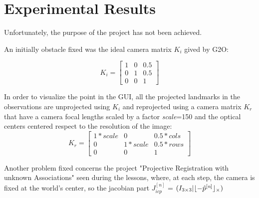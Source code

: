 \documentclass[10pt]{article}
\DeclarePairedDelimiter\floor{\lfloor}{\rfloor}
\begin{document}
	\section{Experimental Results}	
	Unfortunately, the purpose of the project has not been achieved. 
	
	An initially obstacle fixed was the ideal camera matrix $K_i$ gived by G2O: 
	
	\[
	K_i =
	\begin{bmatrix}
   		1 & 0 & 0.5\\
   		0 & 1 & 0.5\\
   		0 & 0 &  1
	\end{bmatrix}
	\]
	
	In order to visualize the point in the GUI, all the projected landmarks in the observations are unprojected using $K_i$ and reprojected using a camera matrix $K_r$ that have a camera focal lengths scaled by a factor \textit{scale}=150 and the optical centers centered respect to the resolution of the image:
		\[
	K_r =
	\begin{bmatrix}
   		1*scale & 0 & 0.5*cols\\
   		0 & 1*scale & 0.5*rows\\
   		0 & 0 &  1
	\end{bmatrix}
	\]
	
	Another problem fixed concerns the project "Projective Registration with unknown Associations" seen during the lessons, where, at each step, the camera is fixed at the world's center, so the jacobian part $J_{icp}^{[\textit{n}]}$ = $(I_{3\times 3} | \floor{- \hat{p}^{[\textit{n}]} }_{\times})$
	
	
\end{document}
